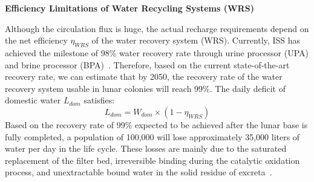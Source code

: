 \medskip
\noindent\textbf{Efficiency Limitations of Water Recycling Systems (WRS)}\par
Although the circulation flux is huge, the actual recharge requirements depend on the net efficiency $\eta_{WRS}$ of the water recovery system (WRS).
Currently, ISS has achieved the milestone of 98\% water recovery rate through urine processor (UPA) and brine processor (BPA)~\cite{adu2025water}.
Therefore, based on the current state-of-the-art recovery rate, we can estimate that by 2050, the recovery rate of the water recovery system usable in lunar colonies will reach 99\%.
The daily deficit of domestic water $L_{dom}$ satisfies:
\[L_{dom}=W_{dom}\times(1-\eta_{WRS})\]
\indent Based on the recovery rate of 99\% expected to be achieved after the lunar base is fully completed, a population of 100,000 will lose approximately 35,000 liters of water per day in the life cycle. These losses are mainly due to the saturated replacement of the filter bed, irreversible binding during the catalytic oxidation process, and unextractable bound water in the solid residue of excreta~\cite{nelson2009water}.
\begin{table}[htbp]
\centering
\caption{Comparison of Domestic Water Usage and Recycling Efficiency under Different Environments}
\label{tab:water_usage_comparison}

\end{table}
\FloatBarrier



